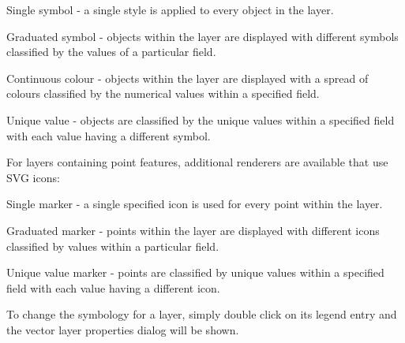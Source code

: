 \begin{compactdesc}
    \item[Single symbol] - a single style is applied to every
    object in the layer.
    \item[Graduated symbol] - objects within the layer are
    displayed with different symbols classified by the values of a
    particular field.
    \item[Continuous colour] - objects within the layer are
    displayed with a spread of colours classified by the numerical
    values within a specified field.
    \item[Unique value] - objects are classified by the unique
    values within a specified field with each value having a
    different symbol.
\end{compactdesc}

For layers containing point features, additional renderers are
available that use SVG icons:

\begin{compactdesc}
    \item[Single marker] - a single specified icon is used for
    every point within the layer.
    \item[Graduated marker] - points within the layer are
    displayed with different icons classified by values within a
    particular field.
    \item[Unique value marker] - points are classified by unique
    values within a specified field with each value having a
    different icon.
\end{compactdesc}

To change the symbology for a layer, simply double click on its legend entry and
the vector layer properties dialog will be shown.

